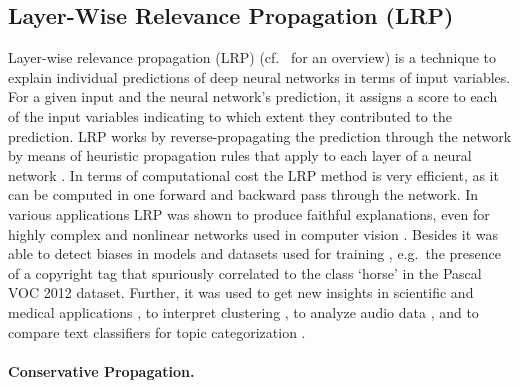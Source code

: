 \documentclass[runningheads]{llncs}
\begin{document}
\subsection{Layer-Wise Relevance Propagation (LRP)}
\label{Arr:sec:LRP}

Layer-wise relevance propagation (LRP) \cite{Arr:Bach:15} (cf.\ \cite{Arr:montavon2019overview} for an overview) is a technique to explain individual predictions of deep neural networks in terms of input variables. For a given input and the neural network's prediction, it assigns a score to each of the input variables indicating to which extent they contributed to the prediction. LRP works by reverse-propagating the prediction through the network by means of heuristic propagation rules that apply to each layer of a neural network \cite{Arr:Bach:15}. In terms of computational cost the LRP method is very efficient, as it can be computed in one forward and backward pass through the network. In various applications LRP was shown to produce faithful explanations, even for highly complex and nonlinear networks used in computer vision \cite{Arr:Bach:15,Arr:Samek:TNNLS2017}. Besides it was able to detect biases in models and datasets used for training \cite{Arr:lapuschkin2019intelligent}, e.g.\ the presence of a copyright tag that spuriously correlated to the class `horse' in the Pascal VOC 2012 dataset. Further, it was used to get new insights in scientific and medical applications \cite{Arr:sturm2016eeg,Arr:Horst:SREP19,Arr:Yang:ICHI2018}, to interpret clustering  \cite{Arr:kauffmann2019}, to analyze audio data \cite{Arr:Thuillier:2018ICASSP,Arr:Becker:2018}, and to compare text classifiers for topic categorization \cite{Arr:Arras:PLOSONE2017}.

\paragraph{Conservative Propagation.}
\end{document}
